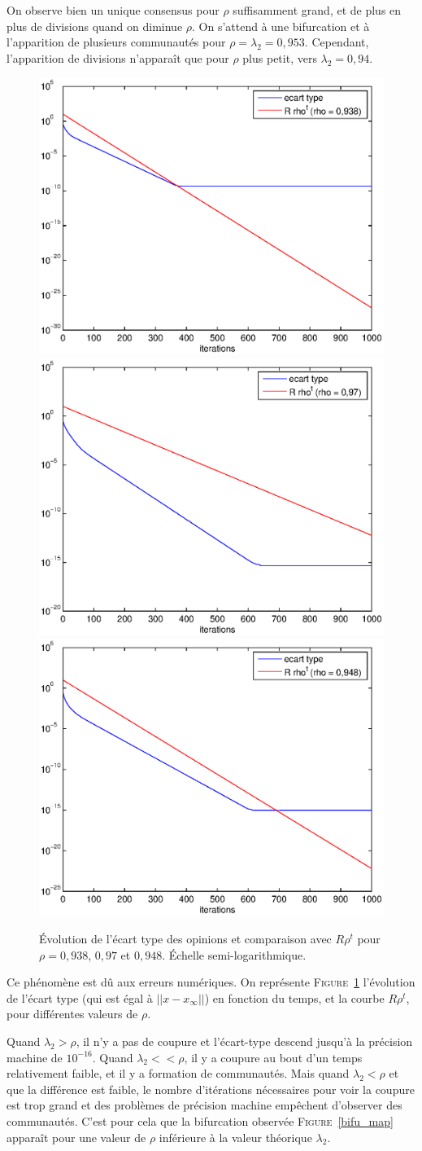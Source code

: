 \documentclass[12pt]{article}
\newcommand{\fig}[1]{\textsc{Figure}~\ref{#1}}
\begin{document}
On observe bien un unique consensus pour $\rho$ suffisamment grand, et
de plus en plus de divisions quand on diminue $\rho$. On s'attend
à une bifurcation et à l'apparition de plusieurs communautés pour
$\rho = \lambda_2 = 0,953$. Cependant, l'apparition de divisions
n'apparaît que pour $\rho$ plus petit, vers $\lambda_2 = 0,94$.
\begin{figure}[h!]
	\begin{center}
		\includegraphics[width=.4\textwidth]{var_rho_0938}
		\includegraphics[width=.4\textwidth]{var_rho_097}
		\includegraphics[width=.5\textwidth]{var_rho_0948}
		\caption{Évolution de l'écart type des opinions et
 comparaison avec $R \rho^t$ pour $\rho = 0,938$,
 $0,97$ et $0,948$. Échelle semi-logarithmique.}
		\label{num_coupure}
	\end{center}
\end{figure}
Ce phénomène est dû aux erreurs numériques. On représente
\fig{num_coupure} l'évolution de l'écart type (qui est égal à $||x -
x_\infty||$) en fonction du temps, et la courbe $R \rho^t$, pour
différentes valeurs de $\rho$.

Quand $\lambda_2 > \rho$, il n'y a pas de coupure et l'écart-type
descend jusqu'à la précision machine de $10^{-16}$. Quand $\lambda_2
<< \rho$, il y a coupure au bout d'un temps relativement faible, et il
y a formation de communautés. Mais quand $\lambda_2 < \rho$ et que la
différence est faible, le nombre d'itérations nécessaires pour voir la
coupure est trop grand et des problèmes de précision machine empêchent
d'observer des communautés. C'est pour cela que la bifurcation
observée \fig{bifu_map} apparaît pour une valeur de $\rho$ inférieure
à la valeur théorique $\lambda_2$.
\end{document}
